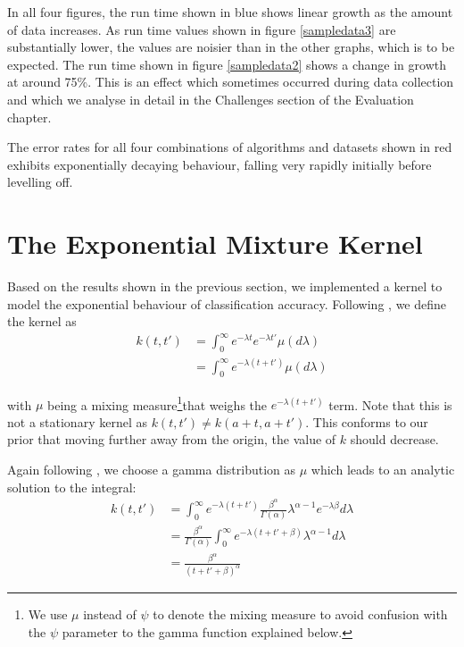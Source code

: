 \documentclass[a4paper,12pt,twoside,openright]{report}
\begin{document}
In all four figures, the run time shown in blue shows linear growth as the amount of data increases. As run time values shown in figure \ref{sampledata3} are substantially lower, the values are noisier than in the other graphs, which is to be expected. The run time shown in figure \ref{sampledata2} shows a change in growth at around 75\%. This is an effect which sometimes occurred during data collection and which we analyse in detail in the Challenges section of the Evaluation chapter.

The error rates for all four combinations of algorithms and datasets shown in red exhibits exponentially decaying behaviour, falling very rapidly initially before levelling off.









\section{The Exponential Mixture Kernel}

Based on the results shown in the previous section, we implemented a kernel to model the exponential behaviour of classification accuracy. Following \cite{2014arXiv1406.3896S}, we define the kernel as
\begin{align}
k(t,t') &= \int_{0}^{\infty} e^{-\lambda t}e^{-\lambda t'}\mu(d\lambda)\\
&= \int_{0}^{\infty} e^{-\lambda(t+t')}\mu(d\lambda)
\end{align}

with $\mu$ being a mixing measure\footnote{We use $\mu$ instead of $\psi$ to denote the mixing measure to avoid confusion with the $\psi$ parameter to the gamma function explained below.}that weighs the $e^{-\lambda(t+t')}$ term. Note that this is not a stationary kernel as $k(t, t') \neq k(a + t, a + t')$. This conforms to our prior that moving further away from the origin, the value of $k$ should decrease.

Again following \cite{2014arXiv1406.3896S}, we choose a gamma distribution as $\mu$ which leads to an analytic solution to the integral:
\begin{align}
k(t, t') &= \int_0^{\infty} e^{-\lambda(t+t')}\frac{\beta^\alpha}{\Gamma(\alpha)}\lambda^{\alpha -1}e^{-\lambda\beta} d\lambda\\
&=\frac{\beta^\alpha}{\Gamma(\alpha)}\int_0^\infty e^{-\lambda(t+t'+\beta)}\lambda^{\alpha-1}d\lambda\\
&=\frac{\beta^\alpha}{(t+t'+\beta)^\alpha}
\end{align}
\end{document}
